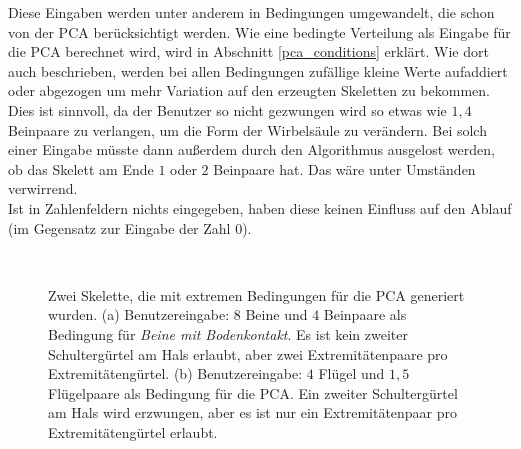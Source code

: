 Diese Eingaben werden unter anderem in Bedingungen umgewandelt, die schon von der PCA berücksichtigt werden. Wie eine bedingte Verteilung als Eingabe für die PCA berechnet wird, wird in Abschnitt \ref{pca_conditions} erklärt. Wie dort auch beschrieben, werden bei allen Bedingungen zufällige kleine Werte aufaddiert oder abgezogen um mehr Variation auf den erzeugten Skeletten zu bekommen. Dies ist sinnvoll, da der Benutzer so nicht gezwungen wird so etwas wie $1{,}4$ Beinpaare zu verlangen, um \zb die Form der Wirbelsäule zu verändern. Bei solch einer Eingabe müsste dann außerdem durch den Algorithmus ausgelost werden, ob das Skelett am Ende $1$ oder $2$ Beinpaare hat. Das wäre unter Umständen verwirrend.\\
Ist in Zahlenfeldern nichts eingegeben, haben diese keinen Einfluss auf den Ablauf (im Gegensatz zur Eingabe der Zahl $0$).

\begin{figure}
 ~
 
 \caption{Zwei Skelette, die mit extremen Bedingungen für die PCA generiert wurden. (a) Benutzereingabe: $8$ Beine und $4$ Beinpaare als Bedingung für \emph{Beine mit Bodenkontakt}. Es ist kein zweiter Schultergürtel am Hals erlaubt, aber zwei Extremitätenpaare pro Extremitätengürtel. (b) Benutzereingabe: $4$ Flügel und $1{,}5$ Flügelpaare als Bedingung für die PCA. Ein zweiter Schultergürtel am Hals wird erzwungen, aber es ist nur ein Extremitätenpaar pro Extremitätengürtel erlaubt.}
 \label{more_extremities}
\end{figure}

